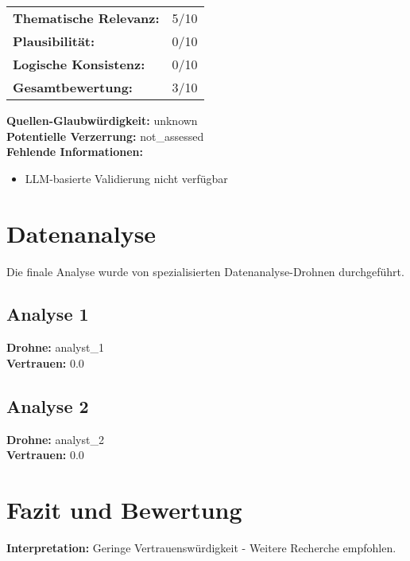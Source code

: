 \documentclass[12pt,a4paper]{article}
\begin{document}
\begin{tabular}{ll}
\textbf{Thematische Relevanz:} & 5/10 \\
\textbf{Plausibilität:} & 0/10 \\
\textbf{Logische Konsistenz:} & 0/10 \\
\textbf{Gesamtbewertung:} & 3/10 \\
\end{tabular}

\textbf{Quellen-Glaubwürdigkeit:} unknown\\
\textbf{Potentielle Verzerrung:} not\_assessed\\
\textbf{Fehlende Informationen:}
\begin{itemize}
\item LLM-basierte Validierung nicht verfügbar
\end{itemize}


\newpage
\section{Datenanalyse}

Die finale Analyse wurde von spezialisierten Datenanalyse-Drohnen durchgeführt.

\subsection{Analyse 1}

\textbf{Drohne:} analyst\_1\\
\textbf{Vertrauen:} 0.0%

\subsection{Analyse 2}

\textbf{Drohne:} analyst\_2\\
\textbf{Vertrauen:} 0.0%


\newpage
\section{Fazit und Bewertung}


\textbf{Interpretation:} Geringe Vertrauenswürdigkeit - Weitere Recherche empfohlen.
\end{document}
